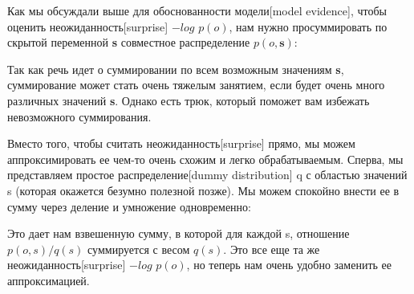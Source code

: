 \documentclass[twoside,leqno, 11pt]{article}
\begin{document}
	Как мы обсуждали выше для обоснованности модели[model evidence], чтобы оценить неожиданность[surprise] $-log$ $p(o)$, нам  нужно просуммировать по скрытой переменной \textbf{s} совместное распределение $p(o, \textbf{s})$:
	
	\begin{figure}[h!]
		\label{ris:image}
	\end{figure}
	
	Так как речь идет о суммировании по всем возможным значениям \textbf{s}, суммирование может стать очень тяжелым занятием, если будет очень много различных значений \textbf{s}. Однако есть трюк, который поможет вам избежать невозможного суммирования.
	
	Вместо того, чтобы считать неожиданность[surprise] прямо, мы можем аппроксимировать ее чем-то очень схожим и легко обрабатываемым. Сперва, мы представляем простое распределение[dummy distribution] q с областью значений s (которая окажется безумно полезной позже). Мы можем спокойно внести ее в сумму через деление и умножение одновременно: 
	
	\begin{figure}[h!]
		\label{ris:image}
	\end{figure}
	
	Это дает нам взвешенную сумму, в которой для каждой s, отношение $p(o, s)/q(s)$ суммируется с весом $q(s)$. Это все еще та же неожиданность[surprise] $-log$ $p(o)$, но теперь нам очень удобно заменить ее аппроксимацией.
	
\end{document}
